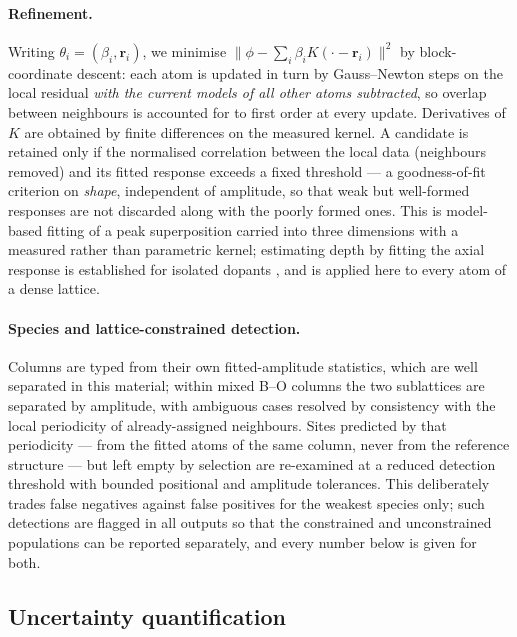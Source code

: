\documentclass[aps,prb,twocolumn,superscriptaddress,floatfix,nofootinbib]{revtex4-2}
\begin{document}
\paragraph{Refinement.} Writing $\theta_i=(\beta_i,\mathbf{r}_i)$, we minimise
$\lVert\phi-\sum_i\beta_iK(\cdot-\mathbf{r}_i)\rVert^2$ by block-coordinate descent: each atom
is updated in turn by Gauss--Newton steps on the local residual \emph{with the current models of
all other atoms subtracted}, so overlap between neighbours is accounted for to first order at
every update. Derivatives of $K$ are obtained by finite differences on the measured kernel. A
candidate is retained only if the normalised correlation between the local data (neighbours
removed) and its fitted response exceeds a fixed threshold --- a goodness-of-fit criterion on
\emph{shape}, independent of amplitude, so that weak but well-formed responses are not discarded
along with the poorly formed ones. This is model-based fitting of a peak superposition
\citep{DeBacker2016} carried into three dimensions with a measured rather than parametric
kernel; estimating depth by fitting the axial response is established for isolated dopants
\citep{Chen2021,Ishikawa2014}, and is applied here to every atom of a dense lattice.

\paragraph{Species and lattice-constrained detection.} Columns are typed from their own
fitted-amplitude statistics, which are well separated in this material; within mixed B--O
columns the two sublattices are separated by amplitude, with ambiguous cases resolved by
consistency with the local periodicity of already-assigned neighbours. Sites predicted by that
periodicity --- from the fitted atoms of the same column, never from the reference structure ---
but left empty by selection are re-examined at a reduced detection threshold with bounded
positional and amplitude tolerances. This deliberately trades false negatives against false
positives for the weakest species only; such detections are flagged in all outputs so that the
constrained and unconstrained populations can be reported separately, and every number below is
given for both.

\subsection{Uncertainty quantification}
\label{sec:uq}
\end{document}
